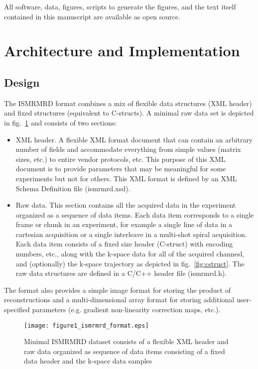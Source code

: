 \documentclass[12pt]{article}
\begin{document}
All software, data, figures, scripts to generate the figures, and the text itself contained in this manuscript are available as open source. 


\section*{Architecture and Implementation}
\subsection*{Design}
The ISMRMRD format combines a mix of flexible data structures (XML header) and fixed structures (equivalent to C-structs).  A minimal raw data set is depicted in fig.~\ref{fig:format} and consists of two sections:
\begin{itemize}
\item{XML header.} A flexible XML format document that can contain an arbitrary number of fields and accommodate everything from simple values (matrix sizes, etc.) to entire vendor protocols, etc. This purpose of this XML document is to provide parameters that may be meaningful for some experiments but not for others. This XML format is defined by an XML Schema Definition file (ismrmrd.xsd).
\item{Raw data.} This section contains all the acquired data in the experiment organized as a sequence of data items.  Each data item corresponds to a single frame or chunk in an experiment, for example a single line of data in a cartesian acquisition or a single interleave in a multi-shot spiral acquisition. Each data item consists of a fixed size header (C-struct) with encoding numbers, etc., along with the k-space data for all of the acquired channesl, and (optionally) the k-space trajectory as depicted in fig.~\ref{fig:cstruct}. The raw data structures are defined in a C/C++ header file (ismrmrd.h).
\end{itemize}
The format also provides a simple image format for storing the product of reconstructions and a multi-dimensional array format for storing additional user-specified parameters (e.g. gradient non-linearity correction maps, etc.).

\begin{figure}
\begin{center}
\texttt{[image: figure1\_ismrmrd\_format.eps]}
\caption{Minimal ISMRMRD dataset consists of a flexible XML header and raw data organized as sequence of data items consisting of a fixed data header and the k-space data samples}
\label{fig:format}
\end{center}
\end{figure}
\end{document}
